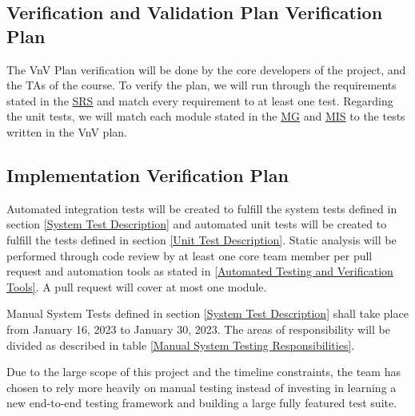 \documentclass[12pt, titlepage]{article}
\begin{document}
\subsection{Verification and Validation Plan Verification Plan}

The VnV Plan verification will be done by the core developers of the project, and the TAs of the
course. To verify the plan, we will run through the requirements stated in the
\href{https://github.com/arkinmodi/project-sayyara/blob/main/docs/SRS/SRS.pdf}{SRS} and match every
requirement to at least one test. Regarding the unit tests, we will match each module stated in the
\href{https://github.com/arkinmodi/project-sayyara/blob/main/docs/Design/MG/MG.pdf}{MG} and
\href{https://github.com/arkinmodi/project-sayyara/blob/main/docs/Design/MIS/MIS.pdf}{MIS} to the
tests written in the VnV plan.




\subsection{Implementation Verification Plan}

Automated integration tests will be created to fulfill the system tests defined in section
\ref{System Test Description} and automated unit tests will be created to fulfill the tests defined
in section \ref{Unit Test Description}. Static analysis will be performed through code review by at
least one core team member per pull request and automation tools as stated in \ref{Automated
	Testing and Verification Tools}. A pull request will cover at most one module.

Manual System Tests defined in section \ref{System Test Description} shall take place from January
16, 2023 to January 30, 2023. The areas of responsibility will be divided as described in table
\ref{Manual System Testing Responsibilities}.

Due to the large scope of this project and the timeline constraints, the team has chosen to rely
more heavily on manual testing instead of investing in learning a new end-to-end testing framework
and building a large fully featured test suite.
\end{document}
